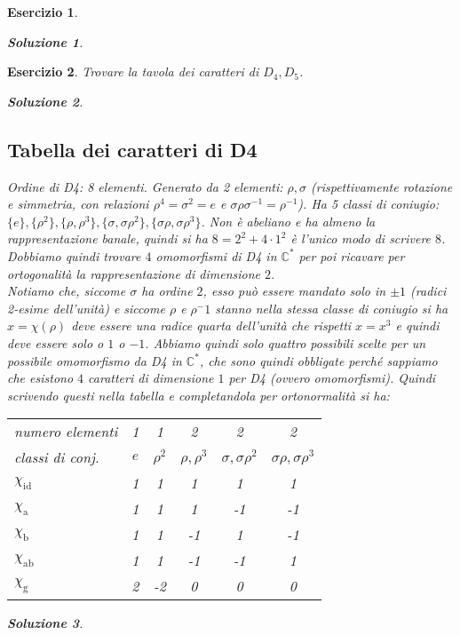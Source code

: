 \documentclass[a4paper]{article}
\theoremstyle{break}
\newtheorem{ex}{{ \Large Esercizio} }
\theoremstyle{plain}
\newtheorem{sol}{Soluzione}[ex]
\newcommand{\bbC}{\mathbb{C}}
\begin{document}
\begin{ex}
\begin{sol}

\end{sol}


\end{ex}

\begin{ex}
Trovare la tavola dei caratteri di $D_4, D_5$.

\begin{sol}
\subsection{Tabella dei caratteri di D4}
	Ordine di D4: 8 elementi. Generato da 2 elementi: $\rho, \sigma$ (rispettivamente rotazione e simmetria, con relazioni $\rho^4 = \sigma^2 = e$ e $\sigma \rho \sigma^{-1} = \rho^{-1}$). Ha 5 classi di coniugio: $\{e\}, \{\rho^2\}, \{\rho, \rho^3\}, \{\sigma, \sigma\rho^2\}, \{\sigma\rho, \sigma\rho^3\}$. Non è abeliano e ha almeno la rappresentazione banale, quindi si ha $8 = 2^2 + 4 \cdot 1^2$ è l'unico modo di scrivere $8$. Dobbiamo quindi trovare $4$ omomorfismi di D4 in $\bbC^{*}$ per poi ricavare per ortogonalità la rappresentazione di dimensione $2$. \\
	Notiamo che, siccome $\sigma$ ha ordine $2$, esso può essere mandato solo in $\pm 1$ (radici 2-esime dell'unità) e siccome $\rho$ e $\rho^-1$ stanno nella stessa classe di coniugio si ha $x = \chi(\rho)$ deve essere una radice quarta dell'unità che rispetti $x = x^3$ e quindi deve essere solo o $1$ o $-1$. Abbiamo quindi solo quattro possibili scelte per un possibile omomorfismo da D4 in $\bbC^{*}$, che sono quindi obbligate perché sappiamo che esistono $4$ caratteri di dimensione $1$ per D4 (ovvero omomorfismi). Quindi scrivendo questi nella tabella e completandola per ortonormalità si ha: \\
	\begin{center} \begin{tabular}{lccccc}
	numero elementi   & 1   & 1   & 2   & 2   & 2   \\
	classi di conj.   & $e$  & $\rho^2$ & $\rho, \rho^3$ & $\sigma, \sigma\rho^2$ & $\sigma\rho, \sigma\rho^3$ \\ \hline
	$\chi_\text{id}$  & 1   & 1   & 1   & 1   & 1   \\
	$\chi_\text{a}$   & 1   & 1   & 1   & -1  & -1  \\
	$\chi_\text{b}$   & 1   & 1   & -1  & 1   & -1  \\
	$\chi_\text{ab}$  & 1   & 1   & -1  & -1  & 1   \\
	$\chi_\text{g}$   & 2   & -2  & 0   & 0   & 0   \\
	\end{tabular} \end{center} \vskip 0.5cm
\end{sol}

\begin{sol}

\end{sol}


\end{ex}
\end{document}
